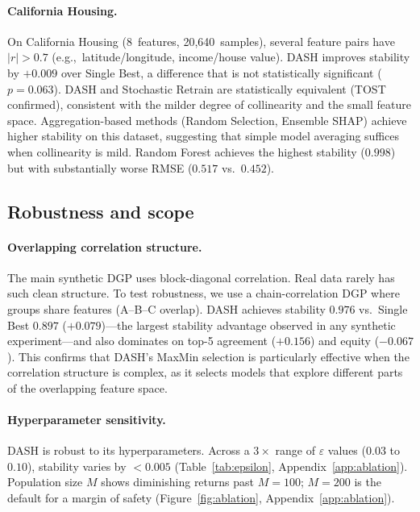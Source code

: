 \documentclass[11pt]{article}
\newcommand{\dash}{\textsc{DASH}}
\newcommand{\eg}{e.g.,\ }
\begin{document}
\paragraph{California Housing.}
On California Housing (8~features, 20,640~samples), several feature
pairs have $|r| > 0.7$ (\eg latitude/longitude, income/house value).
\dash{} improves stability by $+0.009$ over Single Best, a difference
that is not statistically significant ($p = 0.063$). \dash{} and
Stochastic Retrain are statistically equivalent (TOST confirmed),
consistent with the milder degree of collinearity and the small feature
space. Aggregation-based methods (Random Selection, Ensemble SHAP)
achieve higher stability on this dataset, suggesting that simple model
averaging suffices when collinearity is mild. Random Forest achieves
the highest stability ($0.998$) but with substantially worse RMSE
($0.517$ vs.\ $0.452$).

\subsection{Robustness and scope}
\label{sec:robustness}

\paragraph{Overlapping correlation structure.}
The main synthetic DGP uses block-diagonal correlation. Real data rarely
has such clean structure. To test robustness, we use a chain-correlation
DGP where groups share features (A--B--C overlap). \dash{} achieves
stability $0.976$ vs.\ Single Best $0.897$ ($+0.079$)---the largest
stability advantage observed in any synthetic experiment---and also
dominates on top-5 agreement ($+0.156$) and equity ($-0.067$). This
confirms that \dash{}'s MaxMin selection is particularly effective when
the correlation structure is complex, as it selects models that explore
different parts of the overlapping feature space.

\paragraph{Hyperparameter sensitivity.}
\dash{} is robust to its hyperparameters. Across a $3\times$ range of
$\varepsilon$ values ($0.03$ to $0.10$), stability varies by $< 0.005$
(Table~\ref{tab:epsilon}, Appendix~\ref{app:ablation}).
Population size $M$ shows diminishing returns past $M = 100$;
$M = 200$ is the default for a margin of safety
(Figure~\ref{fig:ablation}, Appendix~\ref{app:ablation}).
\end{document}
